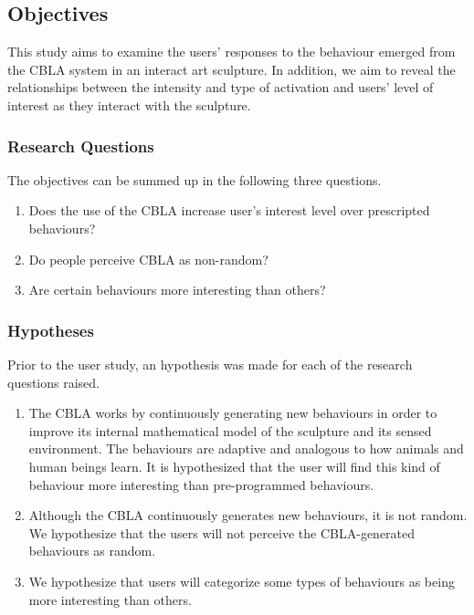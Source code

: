 \subsection{Objectives}

This study aims to examine the users' responses to the behaviour emerged from the CBLA system in an interact art sculpture. In addition, we aim to reveal the relationships between the intensity and type of activation and users' level of interest as they interact with the sculpture.

\subsubsection{Research Questions}

The objectives can be summed up in the following three questions.

\begin{enumerate}
	\item Does the use of the CBLA increase user's interest level over prescripted behaviours?\label{itm:research-q1}
	\item Do people perceive CBLA as non-random?\label{itm:research-q2}
	\item Are certain behaviours  more interesting than others?\label{itm:research-q3}
\end{enumerate}


\subsubsection{Hypotheses}

Prior to the user study, an hypothesis was made for each of the research questions raised.

\begin{enumerate}
	\item The CBLA works by continuously generating new behaviours in order to improve its internal mathematical model of the sculpture and its sensed environment. The behaviours are adaptive and analogous to how animals and human beings learn. It is hypothesized that the user will find this kind of behaviour more interesting than pre-programmed behaviours.
	\item Although the CBLA continuously generates new behaviours, it is not random. We hypothesize that the users will not perceive the CBLA-generated behaviours as random. 
	\item We hypothesize that users will categorize some types of behaviours as being more interesting than others. 
\end{enumerate}


